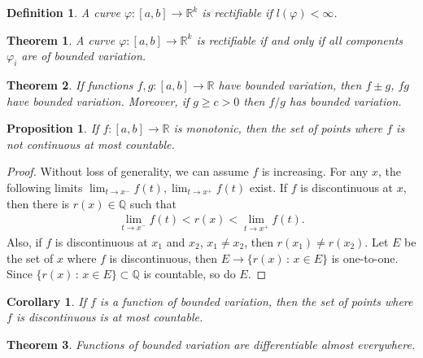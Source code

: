 \documentclass[11pt]{book}
\newtheorem{definition}{Definition}[chapter]
\newtheorem{theorem}{Theorem}[chapter]
\newtheorem{corollary}{Corollary}[theorem]
\newtheorem{proposition}{Proposition}[chapter]
\theoremstyle{definition}
\numberwithin{equation}{chapter}
\begin{document}
\medskip

\begin{definition}
A curve $\varphi: [a,b] \to \mathbb{R}^k$ is rectifiable if $l(\varphi) < \infty$.
\end{definition}

\medskip

\begin{theorem}
A curve $\varphi: [a,b] \to \mathbb{R}^k$ is rectifiable if and only if all components $\varphi_i$ are of bounded variation.
\end{theorem}

\medskip

\begin{theorem}
If functions $f, g: [a,b] \to \mathbb{R}$ have bounded variation, then $f \pm g$, $fg$ have bounded variation. Moreover, if $g \geq c > 0$ then $f/g$ has bounded variation.
\end{theorem}

\medskip

\begin{proposition}\label{prop_62}
If $f: [a,b] \to \mathbb{R}$ is monotonic, then the set of points where $f$ is not continuous at most countable.
\end{proposition}
\begin{proof}
Without loss of generality, we can assume $f$ is increasing. For any $x$, the following limits $\lim_{t \to x^-} f(t), \lim_{t \to x^+} f(t)$ exist. If $f$ is discontinuous at $x$, then there is $r(x) \in \mathbb{Q}$ such that
\begin{align*}
    \lim_{t \to x^-} f(t) < r(x) < \lim_{t \to x^+} f(t).
\end{align*}
Also, if $f$ is discontinuous at $x_1$ and $x_2$, $x_1 \neq x_2$, then $r(x_1) \neq r(x_2)$. Let $E$ be the set of $x$ where $f$ is discontinuous, then $E \to \{r(x) \,:\, x \in E\}$ is one-to-one. Since $\{r(x) \,:\, x \in E\} \subset \mathbb{Q}$ is countable, so do $E$. 
\end{proof}

\medskip

\begin{corollary}
If $f$ is a function of bounded variation, then the set of points where $f$ is discontinuous is at most countable.
\end{corollary}

\medskip

\begin{theorem}\label{theorem_610}
Functions of bounded variation are differentiable almost everywhere.
\end{theorem}
\end{document}
